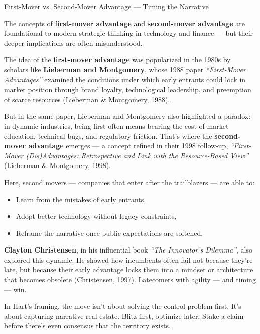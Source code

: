 \begin{HistoricalSidebar}{First-Mover vs. Second-Mover Advantage --- Timing the Narrative}

    The concepts of \textbf{first-mover advantage} and \textbf{second-mover advantage} are foundational 
    to modern strategic thinking in technology and finance — but their deeper implications are often 
    misunderstood.
    
    \medskip
    
    The idea of the \textbf{first-mover advantage} was popularized in the 1980s by scholars like 
    \textbf{Lieberman and Montgomery}, whose 1988 paper \textit{“First-Mover Advantages”} examined 
    the conditions under which early entrants could lock in market position through brand loyalty, 
    technological leadership, and preemption of scarce resources (Lieberman \& Montgomery, 1988).
    
    \medskip
    
    But in the same paper, Lieberman and Montgomery also highlighted a paradox: in dynamic industries, 
    being first often means bearing the cost of market education, technical bugs, and regulatory 
    friction. That’s where the \textbf{second-mover advantage} emerges — a concept refined in their 
    1998 follow-up, \textit{``First-Mover (Dis)Advantages: Retrospective and Link with the Resource-Based 
    View''} (Lieberman \& Montgomery, 1998).
    
    \medskip
    
    Here, second movers — companies that enter after the trailblazers — are able to:
  
    \medskip
  
    \begin{itemize}
        \item Learn from the mistakes of early entrants,
        \item Adopt better technology without legacy constraints,
        \item Reframe the narrative once public expectations are softened.
    \end{itemize}
    
    \medskip
    
    \textbf{Clayton Christensen}, in his influential book \textit{``The Innovator’s Dilemma''}, also 
    explored this dynamic. He showed how incumbents often fail not because they’re late, but because 
    their early advantage locks them into a mindset or architecture that becomes obsolete (Christensen, 1997). 
    Latecomers with agility — and timing — win.
    
    \medskip
    
    In Hart’s framing, the move isn’t about solving the control problem first. It’s about capturing 
    narrative real estate. Blitz first, optimize later. Stake a claim before there’s even consensus 
    that the territory exists.
    
\end{HistoricalSidebar}
  

